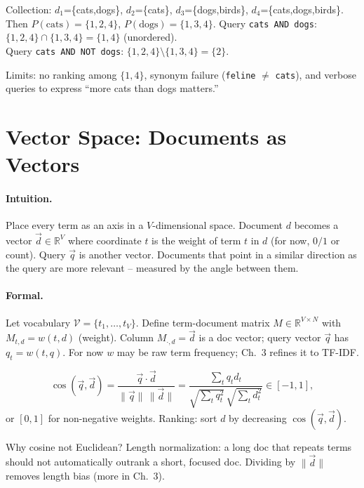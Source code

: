 \begin{example}
\begin{sloppypar}
Collection: $d_1$=\{cats,dogs\}, $d_2$=\{cats\}, $d_3$=\{dogs,birds\}, $d_4$=\{cats,dogs,birds\}. Then $P(\text{cats})=\{1,2,4\}$, $P(\text{dogs})=\{1,3,4\}$. Query \texttt{cats AND dogs}: $\{1,2,4\}\cap\{1,3,4\}=\{1,4\}$ (unordered).\\ Query \texttt{cats AND NOT dogs}: $\{1,2,4\}\setminus\{1,3,4\}=\{2\}$.
\end{sloppypar}
\end{example}

Limits: no ranking among $\{1,4\}$, synonym failure (\texttt{feline} $\neq$ \texttt{cats}), and verbose queries to express ``more cats than dogs matters.''

\section{Vector Space: Documents as Vectors}\label{sec:vector}
\paragraph{Intuition.} Place every term as an axis in a $V$-dimensional space. Document $d$ becomes a vector $\vec{d}\in\mathbb{R}^V$ where coordinate $t$ is the weight of term $t$ in $d$ (for now, $0/1$ or count). Query $\vec{q}$ is another vector. Documents that point in a similar direction as the query are more relevant -- measured by the angle between them.

\paragraph{Formal.} Let vocabulary $\mathcal{V}=\{t_1,\dots,t_V\}$. Define term-document matrix $M\in\mathbb{R}^{V\times N}$ with $M_{t,d}=w(t,d)$ (weight). Column $M_{\cdot,d}=\vec{d}$ is a doc vector; query vector $\vec{q}$ has $q_t=w(t,q)$. For now $w$ may be raw term frequency; Ch.~3 refines it to TF-IDF.

\begin{definition}
\begin{equation}
\cos(\vec{q},\vec{d}) = \frac{\vec{q}\cdot\vec{d}}{\|\vec{q}\|\,\|\vec{d}\|} = \frac{\sum_t q_t d_t}{\sqrt{\sum_t q_t^2}\,\sqrt{\sum_t d_t^2}}\in[-1,1],
\end{equation}
or $[0,1]$ for non-negative weights. Ranking: sort $d$ by decreasing $\cos(\vec{q},\vec{d})$.
\end{definition}
Why cosine not Euclidean? Length normalization: a long doc that repeats terms should not automatically outrank a short, focused doc. Dividing by $\|\vec{d}\|$ removes length bias (more in Ch.~3).

